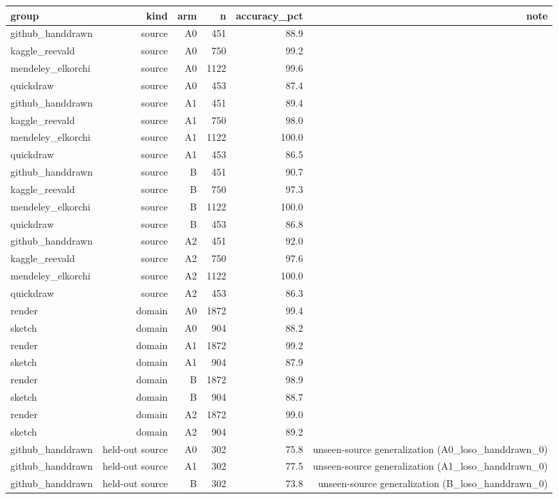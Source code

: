 \begin{tabular}{lrrrrr}
\toprule
group & kind & arm & n & accuracy\_pct & note \\
\midrule
github\_handdrawn & source & A0 & 451 & 88.9 &  \\
kaggle\_reevald & source & A0 & 750 & 99.2 &  \\
mendeley\_elkorchi & source & A0 & 1122 & 99.6 &  \\
quickdraw & source & A0 & 453 & 87.4 &  \\
github\_handdrawn & source & A1 & 451 & 89.4 &  \\
kaggle\_reevald & source & A1 & 750 & 98.0 &  \\
mendeley\_elkorchi & source & A1 & 1122 & 100.0 &  \\
quickdraw & source & A1 & 453 & 86.5 &  \\
github\_handdrawn & source & B & 451 & 90.7 &  \\
kaggle\_reevald & source & B & 750 & 97.3 &  \\
mendeley\_elkorchi & source & B & 1122 & 100.0 &  \\
quickdraw & source & B & 453 & 86.8 &  \\
github\_handdrawn & source & A2 & 451 & 92.0 &  \\
kaggle\_reevald & source & A2 & 750 & 97.6 &  \\
mendeley\_elkorchi & source & A2 & 1122 & 100.0 &  \\
quickdraw & source & A2 & 453 & 86.3 &  \\
render & domain & A0 & 1872 & 99.4 &  \\
sketch & domain & A0 & 904 & 88.2 &  \\
render & domain & A1 & 1872 & 99.2 &  \\
sketch & domain & A1 & 904 & 87.9 &  \\
render & domain & B & 1872 & 98.9 &  \\
sketch & domain & B & 904 & 88.7 &  \\
render & domain & A2 & 1872 & 99.0 &  \\
sketch & domain & A2 & 904 & 89.2 &  \\
github\_handdrawn & held-out source & A0 & 302 & 75.8 & unseen-source generalization (A0\_loso\_handdrawn\_0) \\
github\_handdrawn & held-out source & A1 & 302 & 77.5 & unseen-source generalization (A1\_loso\_handdrawn\_0) \\
github\_handdrawn & held-out source & B & 302 & 73.8 & unseen-source generalization (B\_loso\_handdrawn\_0) \\

\end{tabular}
